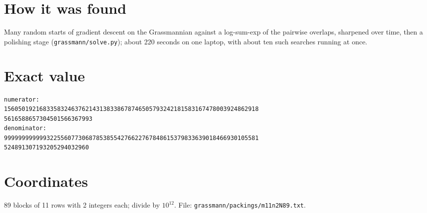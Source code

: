 \documentclass[11pt,a4paper]{article}
\begin{document}
\section{How it was found}
Many random starts of gradient descent on the Grassmannian against a log-sum-exp of the pairwise overlaps, sharpened over time, then a polishing stage (\texttt{grassmann/solve.py}); about 220 seconds on one laptop, with about ten such searches running at once.


\appendix
\section{Exact value}
{\small
\begin{verbatim}
numerator:
156050192168335832463762143138338678746505793242181583167478003924862918
5616588657304501566367993
denominator:
999999999999322556077306878538554276622767848615379833639018466930105581
524891307193205294032960
\end{verbatim}}

\section{Coordinates}
89 blocks of 11 rows with 2 integers each; divide by $10^{12}$. File: \texttt{grassmann/packings/m11n2N89.txt}.
{\tiny
\begin{multicols}{4}
\end{multicols}}
\end{document}

